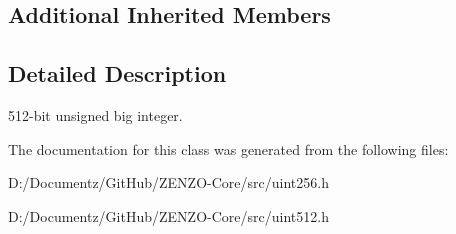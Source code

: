 \subsection*{Additional Inherited Members}


\subsection{Detailed Description}
512-\/bit unsigned big integer. 

The documentation for this class was generated from the following files\+:\begin{DoxyCompactItemize}
\item 
D\+:/\+Documentz/\+Git\+Hub/\+Z\+E\+N\+Z\+O-\/\+Core/src/uint256.\+h\item 
D\+:/\+Documentz/\+Git\+Hub/\+Z\+E\+N\+Z\+O-\/\+Core/src/uint512.\+h\end{DoxyCompactItemize}
